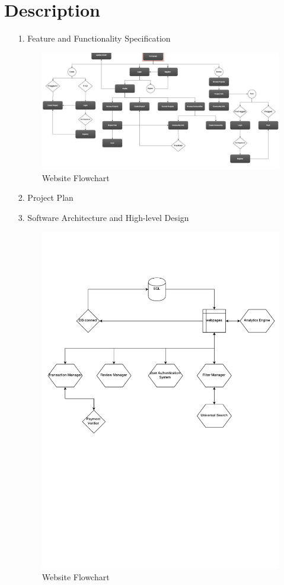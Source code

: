 \documentclass[12pt]{article}
\begin{document}
\section*{Description}
\begin{enumerate}
\item[1.] Feature and Functionality Specification
\begin{figure}[ht!]
\centering
\includegraphics[width=200mm]{flowchart.jpg}
\caption{Website Flowchart \label{overflow}}
\end{figure}

\item[2.] Project Plan 
\item[3.] Software Architecture and High-level Design
\begin{figure}[ht!]
\centering
\includegraphics[width=200mm]{swag.pdf}
\caption{Website Flowchart \label{overflow}}
\end{figure}


\end{enumerate}
\end{document}
